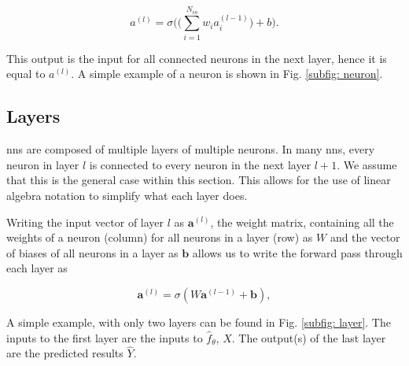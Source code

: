         \begin{equation}
            \label{eq: feed forward}
            a^{(l)} = \sigma\bigg(\big(\sum_{i = 1}^{N_{in}} w_i a_i^{(l-1)}\big) + b\bigg).
        \end{equation}

        This output is the input for all connected \glspl{neuron} in the next layer, hence it is equal to $a^{(l)}$.
        A simple example of a \gls{neuron} is shown in Fig. \ref{subfig: neuron}.

    \subsection{Layers}
        \glspl{nn} are composed of multiple layers of multiple \glspl{neuron}. In many \glspl{nn}, every \gls{neuron} in layer $l$ is connected to every \gls{neuron} in the next layer $l + 1$. We assume that this is the general case within this section. This allows for the use of linear algebra notation to simplify what each layer does.

        Writing the input vector of layer $l$ as $\mathbf{a}^{(l)}$, the weight matrix, containing all the weights of a \gls{neuron} (column) for all \glspl{neuron} in a layer (row) as $W$ and the vector of biases of all \glspl{neuron} in a layer as $\mathbf{b}$ allows us to write the forward pass through each layer as

        \begin{equation}
            \mathbf{a}^{(l)} = \sigma(W\mathbf{a}^{(l-1)} + \mathbf{b}),
        \end{equation}

        A simple example, with only two layers can be found in Fig. \ref{subfig: layer}. The inputs to the first layer are the inputs to $\hat{f}_\theta$, $X$. The output(s) of the last layer are the predicted results $\hat{Y}$.

